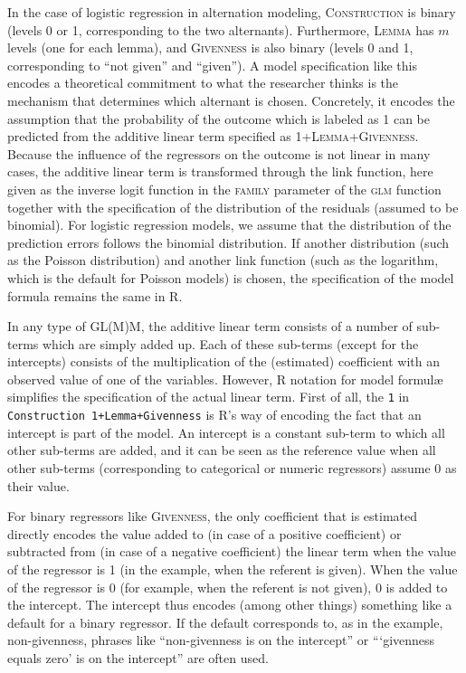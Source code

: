 In the case of logistic regression in alternation modeling, \textsc{Construction} is binary (levels 0 or 1, corresponding to the two alternants).
Furthermore, \textsc{Lemma} has $m$ levels (one for each lemma), and \textsc{Givenness} is also binary (levels 0 and 1, corresponding to ``not given'' and ``given'').
A model specification like this encodes a theoretical commitment to what the researcher thinks is the mechanism that determines which alternant is chosen.
Concretely, it encodes the assumption that the probability of the outcome which is labeled as 1 can be predicted from the additive linear term specified as \textsc{1+Lemma+Givenness}.
Because the influence of the regressors on the outcome is not linear in many cases, the additive linear term is transformed through the link function, here given as the inverse logit function in the \textsc{family} parameter of the \textsc{glm} function together with the specification of the distribution of the residuals (assumed to be binomial).
For logistic regression models, we assume that the distribution of the prediction errors follows the binomial distribution.
If another distribution (such as the Poisson distribution) and another link function (such as the logarithm, which is the default for Poisson models) is chosen, the specification of the model formula remains the same in R.

In any type of GL(M)M, the additive linear term consists of a number of sub-terms which are simply added up.
Each of these sub-terms (except for the intercepts) consists of the multiplication of the (estimated) coefficient with an observed value of one of the variables.
However, R notation for model formulæ simplifies the specification of the actual linear term.
First of all, the \texttt{1} in \texttt{Construction~1+Lemma+Givenness} is R's way of encoding the fact that an intercept is part of the model.
An intercept is a constant sub-term to which all other sub-terms are added, and it can be seen as the reference value when all other sub-terms (corresponding to categorical or numeric regressors) assume 0 as their value.

For binary regressors like \textsc{Givenness}, the only coefficient that is estimated directly encodes the value added to (in case of a positive coefficient) or subtracted from (in case of a negative coefficient) the linear term when the value of the regressor is 1 (in the example, when the referent is given).
When the value of the regressor is 0 (for example, when the referent is not given), 0 is added to the intercept.
The intercept thus encodes (among other things) something like a default for a binary regressor.
If the default corresponds to, as in the example, non-givenness, phrases like ``non-givenness is on the intercept'' or ```givenness equals zero' is on the intercept'' are often used.

